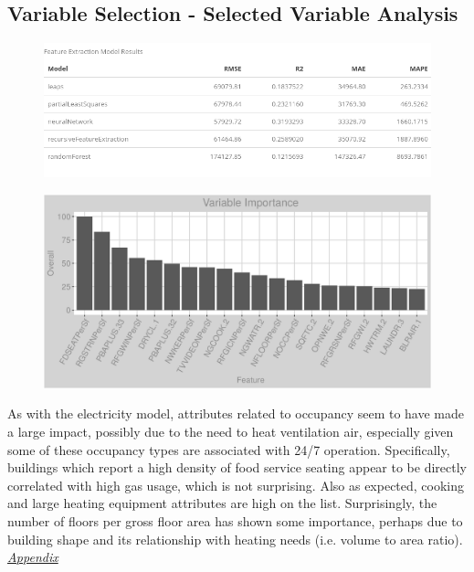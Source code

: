 \subsection{Variable Selection - Selected Variable Analysis}
\begin{figure}[h]
\centering
\includegraphics[width=.8\textwidth, height=0.25\textheight]{Images/natural_gas_psf_fe_summary.png}
\end{figure}
\begin{figure}[h]
\centering
\includegraphics[width=.99\textwidth, height=0.375\textheight]{Images/natural_gas_psf_all_vars.png}
\end{figure}
\FloatBarrier

As with the electricity model, attributes related to occupancy seem to have made a large impact, possibly due to the need to heat ventilation air, especially given some of these occupancy types are associated with 24/7 operation.  Specifically, buildings which report a high density of food service seating appear to be directly correlated with high gas usage, which is not surprising.  Also as expected, cooking and large heating equipment attributes are high on the list.  Surprisingly, the number of floors per gross floor area has shown some importance, perhaps due to building shape and its relationship with heating needs (i.e. volume to area ratio). \textit{\hyperref[appendix:natural_gas:sva]{Appendix}}